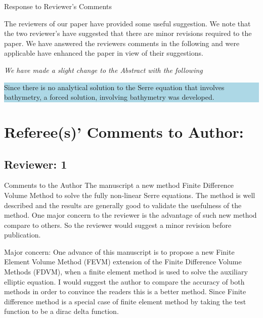 \documentclass[subeqn]{article}
\newcommand{\hlb}[1] {\par\colorbox{lightblue}{\parbox{\linewidth}{#1}}}
\begin{document}
\begin{center}
\begin{large}
Response to Reviewer's Comments
\end{large}
\end{center}

The reviewers of our paper have provided some useful suggestion. We note that the two reviewer's have suggested that there are minor revisions required to the paper. We have answered the reviewers comments in the following and were applicable have enhanced the paper in view of their suggestions.

\emph{We have made a slight change to the Abstract with the following}
\hlb{Since there is no analytical solution to the Serre equation that involves bathymetry, a forced solution, involving bathymetry was developed.}

\section*{Referee(s)' Comments to Author:}

\subsection*{Reviewer: 1}

Comments to the Author
The manuscript a new method Finite Difference Volume Method to solve the fully non-linear Serre equations. The method is well described and the results are generally good to validate the usefulness of the method. One major concern to the reviewer is the advantage of such new method compare to others. So the reviewer would suggest a minor revision before publication.

Major concern:
One advance of this manuscript is to propose a new Finite Element Volume Method (FEVM) extension of the Finite Difference Volume Methods (FDVM), when a finite element method is used to solve the auxiliary elliptic equation. I would suggest the author to compare the accuracy of both methods in order to convince the readers this is a better method. Since Finite difference method is a special case of finite element method by taking the test function to be a dirac delta function.
\end{document}
